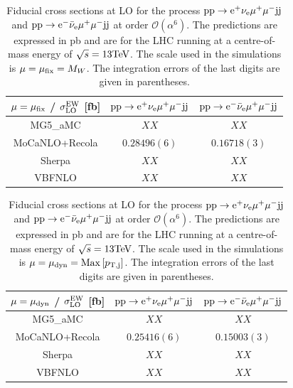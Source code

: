 \documentclass[11pt]{cernrep}
\begin{document}
\begin{table}
\begin{center} 
\begin{tabular}{ c | c | c }
 $\mu = \mu_{\rm fix}$ / $\sigma_{\rm LO}^{\rm EW}$ [fb] & ${\rm p} {\rm p} \to {\rm e}^+  \nu_{\rm e}  \mu^+ \mu^- {\rm j} {\rm j}$  & ${\rm p} {\rm p} \to {\rm e}^-  \bar \nu_{\rm e}  \mu^+ \mu^- {\rm j} {\rm j}$  \\
  \hline\hline
{\sc MG5\_aMC}        & $XX$  & $XX$   \\
  {\sc MoCaNLO}+{\sc Recola}             & $0.28496(6)$  & $0.16718(3)$  \\
{\sc Sherpa}        & $XX$  & $XX$   \\
{\sc VBFNLO}        & $XX$  & $XX$   \\
  \hline
\end{tabular}
\end{center}
\caption{
Fiducial cross sections at LO for the process ${\rm p}{\rm p}\to{\rm e}^+\nu_{\rm e}\mu^+\mu^-{\rm j}{\rm j}$ and ${\rm p}{\rm p}\to{\rm e}^-\bar\nu_{\rm e}\mu^+\mu^-{\rm j}{\rm j}$ at order $\mathcal{O} (\alpha^6)$.
The predictions are expressed in pb and are for the LHC running at a centre-of-mass energy of $\sqrt{s}=13 {\rm TeV}$.
The scale used in the simulations is $\mu = \mu_{\rm fix} = M_W$.
The integration errors of the last digits are given in parentheses.}
\label{table:xsectLOfix}
\end{table}

\begin{table}
\begin{center} 
\begin{tabular}{ c | c | c }
 $\mu = \mu_{\rm dyn}$ / $\sigma_{\rm LO}^{\rm EW}$ [fb] & ${\rm p} {\rm p} \to {\rm e}^+  \nu_{\rm e}  \mu^+ \mu^- {\rm j} {\rm j}$  & ${\rm p} {\rm p} \to {\rm e}^-  \bar \nu_{\rm e}  \mu^+ \mu^- {\rm j} {\rm j}$  \\
  \hline\hline
{\sc MG5\_aMC}        & $XX$  & $XX$   \\
  {\sc MoCaNLO}+{\sc Recola}             & $0.25416(6)$  & $0.15003(3)$  \\
{\sc Sherpa}        & $XX$  & $XX$   \\
{\sc VBFNLO}        & $XX$  & $XX$   \\
  \hline
\end{tabular}
\end{center}
\caption{
Fiducial cross sections at LO for the process ${\rm p}{\rm p}\to{\rm e}^+\nu_{\rm e}\mu^+\mu^-{\rm j}{\rm j}$ and ${\rm p}{\rm p}\to{\rm e}^-\bar\nu_{\rm e}\mu^+\mu^-{\rm j}{\rm j}$ at order $\mathcal{O} (\alpha^6)$.
The predictions are expressed in pb and are for the LHC running at a centre-of-mass energy of $\sqrt{s}=13 {\rm TeV}$.
The scale used in the simulations is $\mu = \mu_{\rm dyn} = {\rm Max}\left[p_{\rm T, j}\right]$.
The integration errors of the last digits are given in parentheses.}
\label{table:xsectLOdyn}
\end{table}
\end{document}
